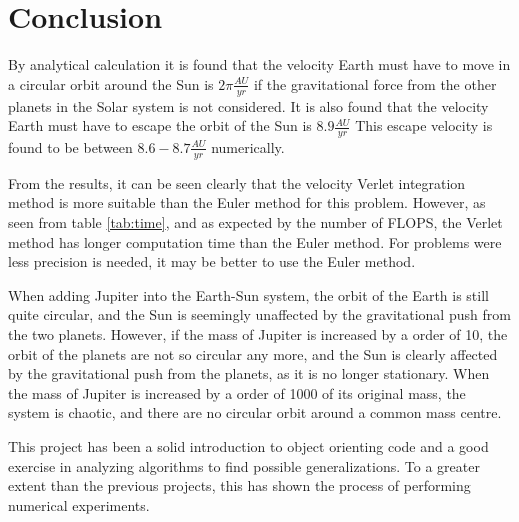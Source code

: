 \section{Conclusion}

By analytical calculation it is found that the velocity Earth must have to move in a circular orbit around the Sun is $2 \pi \frac{AU}{yr}$ if the gravitational force from the other planets in the Solar system is not considered. It is also found that the velocity Earth must have to escape the orbit of the Sun is $8.9 \frac{AU}{yr}$ This escape velocity is found to be between $8.6-8.7 \frac{AU}{yr}$ numerically. 

From the results, it can be seen clearly that the velocity Verlet integration method is more suitable than the Euler method for this problem. However, as seen from table \ref{tab:time}, and as expected by the number of FLOPS, the Verlet method has longer computation time than the Euler method. For problems were less precision is needed, it may be better to use the Euler method. 

When adding Jupiter into the Earth-Sun system, the orbit of the Earth is still quite circular, and the Sun is seemingly unaffected by the gravitational push from the two planets. However, if the mass of Jupiter is increased by a order of 10, the orbit of the planets are not so circular any more, and the Sun is clearly affected by the gravitational push from the planets, as it is no longer stationary. When the mass of Jupiter is increased by a order of 1000 of its original mass, the system is chaotic, and there are no circular orbit around a common mass centre. 

This project has been a solid introduction to object orienting code and a good exercise in
analyzing algorithms to find possible generalizations. To a greater extent than the previous
projects, this has shown the process of performing numerical experiments.
